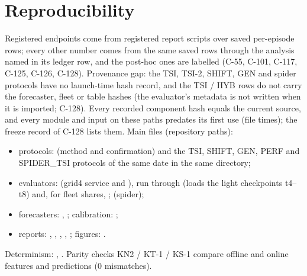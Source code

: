 \documentclass[11pt]{article}
\begin{document}
\section{Reproducibility}
Registered endpoints come from registered report scripts over saved per-episode rows; every other number comes from the same saved rows
through the analysis named in its ledger row, and the post-hoc ones are labelled (C-55, C-101, C-117, C-125, C-126, C-128).
Provenance gap: the TSI, TSI-2, SHIFT, GEN and spider protocols have no launch-time hash record, and the TSI / HYB rows do not carry the
forecaster, fleet or table hashes (the evaluator's metadata is not written when it is imported; C-128). Every recorded component hash equals
the current source, and every module and input on these paths predates its first use (file times); the freeze record of C-128 lists them. Main files (repository paths):
\begin{itemize}\setlength\itemsep{0pt}
\item protocols:  (method and confirmation) and the TSI, SHIFT, GEN, PERF and
SPIDER\_TSI protocols of the same date in the same directory;
\item evaluators:  (grid4 service and ), run through
 (loads the light checkpoints t4--t8) and, for fleet shares, ;  (spider);
\item forecasters: , ; calibration: ;
\item reports: , , , ,
; figures: .
\end{itemize}
Determinism: , . Parity checks KN2 / KT-1 / KS-1 compare offline and online features and
predictions (0 mismatches).
\end{document}
